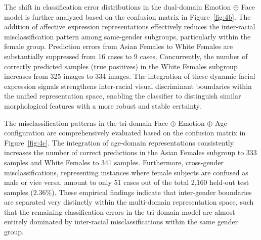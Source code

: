 The shift in classification error distributions in the dual-domain Emotion $\oplus$ Face model is further analyzed based on the confusion matrix in Figure~\ref{fig:4b}. The addition of affective expression representations effectively reduces the inter-racial misclassification pattern among same-gender subgroups, particularly within the female group. Prediction errors from Asian Females to White Females are substantially suppressed from 16 cases to 9 cases. Concurrently, the number of correctly predicted samples (true positives) in the White Females subgroup increases from 325 images to 334 images. The integration of these dynamic facial expression signals strengthens inter-racial visual discriminant boundaries within the unified representation space, enabling the classifier to distinguish similar morphological features with a more robust and stable certainty.

The misclassification patterns in the tri-domain Face $\oplus$ Emotion $\oplus$ Age configuration are comprehensively evaluated based on the confusion matrix in Figure~\ref{fig:4c}. The integration of age-domain representations consistently increases the number of correct predictions in the Asian Females subgroup to 333 samples and White Females to 341 samples. Furthermore, cross-gender misclassifications, representing instances where female subjects are confused as male or vice versa, amount to only 51 cases out of the total 2,160 held-out test samples (2.36\%). These empirical findings indicate that inter-gender boundaries are separated very distinctly within the multi-domain representation space, such that the remaining classification errors in the tri-domain model are almost entirely dominated by inter-racial misclassifications within the same gender group.
